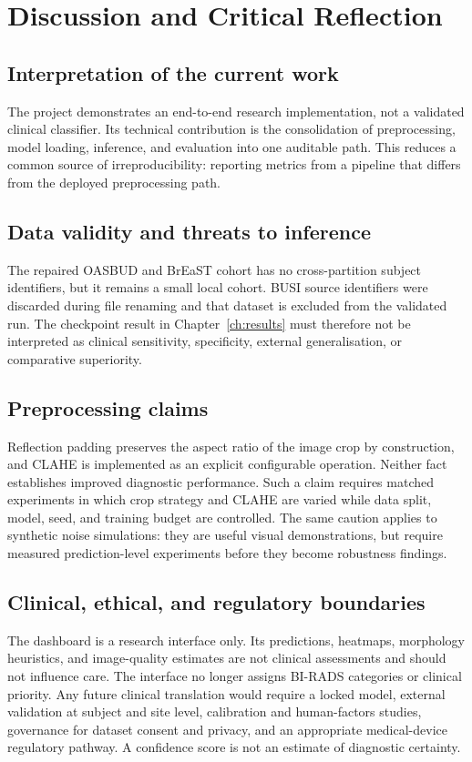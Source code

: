 \chapter{Discussion and Critical Reflection}

\section{Interpretation of the current work}
The project demonstrates an end-to-end research implementation, not a validated clinical classifier. Its technical contribution is the consolidation of preprocessing, model loading, inference, and evaluation into one auditable path. This reduces a common source of irreproducibility: reporting metrics from a pipeline that differs from the deployed preprocessing path.

\section{Data validity and threats to inference}
The repaired OASBUD and BrEaST cohort has no cross-partition subject identifiers, but it remains a small local cohort. BUSI source identifiers were discarded during file renaming and that dataset is excluded from the validated run. The checkpoint result in Chapter~\ref{ch:results} must therefore not be interpreted as clinical sensitivity, specificity, external generalisation, or comparative superiority.

\section{Preprocessing claims}
Reflection padding preserves the aspect ratio of the image crop by construction, and CLAHE is implemented as an explicit configurable operation. Neither fact establishes improved diagnostic performance. Such a claim requires matched experiments in which crop strategy and CLAHE are varied while data split, model, seed, and training budget are controlled. The same caution applies to synthetic noise simulations: they are useful visual demonstrations, but require measured prediction-level experiments before they become robustness findings.

\section{Clinical, ethical, and regulatory boundaries}
The dashboard is a research interface only. Its predictions, heatmaps, morphology heuristics, and image-quality estimates are not clinical assessments and should not influence care. The interface no longer assigns BI-RADS categories or clinical priority. Any future clinical translation would require a locked model, external validation at subject and site level, calibration and human-factors studies, governance for dataset consent and privacy, and an appropriate medical-device regulatory pathway. A confidence score is not an estimate of diagnostic certainty.


